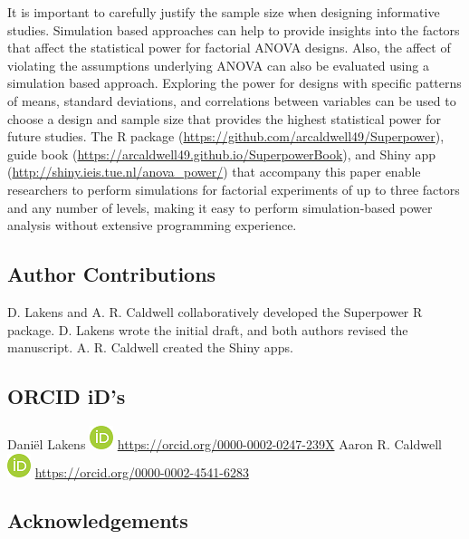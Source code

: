 \documentclass[
  ,jou,floatsintext]{apa6}
\begin{document}
It is important to carefully justify the sample size when designing informative studies.
Simulation based approaches can help to provide insights into the factors that affect the statistical power for factorial ANOVA designs. Also, the affect of violating the assumptions underlying ANOVA can also be evaluated using a simulation based approach.
Exploring the power for designs with specific patterns of means, standard deviations, and correlations between variables can be used to choose a design and sample size that provides the highest statistical power for future studies. The R package (\url{https://github.com/arcaldwell49/Superpower}), guide book (\url{https://arcaldwell49.github.io/SuperpowerBook}), and Shiny app (\url{http://shiny.ieis.tue.nl/anova_power/}) that accompany this paper enable researchers to perform simulations for factorial experiments of up to three factors and any number of levels, making it easy to perform simulation-based power analysis without extensive programming experience.

\hypertarget{author-contributions}{%
\subsection{Author Contributions}\label{author-contributions}}

D. Lakens and A. R. Caldwell collaboratively developed the Superpower R package. D. Lakens wrote the initial draft, and both authors revised the manuscript. A. R. Caldwell created the Shiny apps.

\hypertarget{orcid-ids}{%
\subsection{ORCID iD's}\label{orcid-ids}}

Daniël Lakens \includegraphics{screenshots/orcid.png} \url{https://orcid.org/0000-0002-0247-239X}
Aaron R. Caldwell \includegraphics{screenshots/orcid.png} \url{https://orcid.org/0000-0002-4541-6283}

\hypertarget{acknowledgements}{%
\subsection{Acknowledgements}\label{acknowledgements}}
\end{document}
